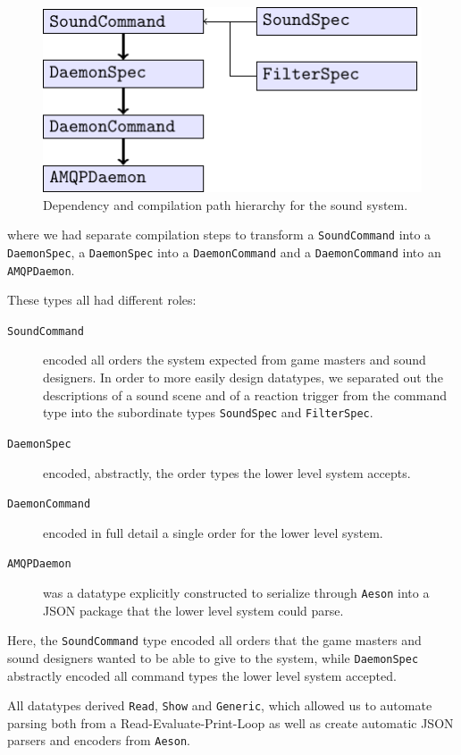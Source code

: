 \begin{figure}[H]
  \centering
  \includegraphics{figure}
  
  \caption{Dependency and compilation path hierarchy for the sound system.}
\label{fig:sshierarchy}
\end{figure}
where we had separate compilation steps to transform a \texttt{SoundCommand}
into a \texttt{DaemonSpec}, a \texttt{DaemonSpec} into a \texttt{DaemonCommand} and a
\texttt{DaemonCommand} into an \texttt{AMQPDaemon}.

These types all had different roles:
\begin{description}
\item[\tt SoundCommand] encoded all orders the system expected from
  game masters and sound designers. In order to more easily design
  datatypes, we separated out the descriptions of a sound scene and of
  a reaction trigger from the command type into the subordinate types
  \texttt{SoundSpec} and \texttt{FilterSpec}.
\item[\tt DaemonSpec] encoded, abstractly, the order types the lower
  level system accepts.
\item[\tt DaemonCommand] encoded in full detail a single order for the
  lower level system.
\item[\tt AMQPDaemon] was a datatype explicitly constructed to serialize
  through \texttt{Aeson} into a JSON package that the lower level
  system could parse.
\end{description}

Here, the \texttt{SoundCommand} type encoded all orders that the game
masters and sound designers wanted to be able to give to the system, while
\texttt{DaemonSpec} abstractly encoded all command types the lower
level system accepted.

All datatypes derived \texttt{Read}, \texttt{Show} and \texttt{Generic},
which allowed us to automate parsing both from a Read-Evaluate-Print-Loop as well as
create automatic JSON parsers and encoders from \texttt{Aeson}. 

